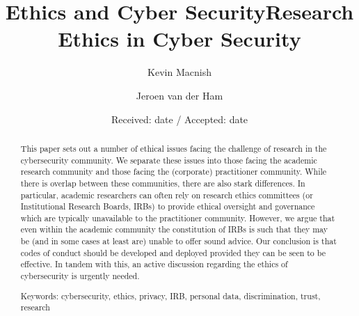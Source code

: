 \documentclass{svjour3}                     %
\begin{document}
\title{Ethics and Cyber Security}


\author{Kevin Macnish         \and
        Jeroen van der Ham}



\date{Received: date / Accepted: date}


\maketitle

\title{Research Ethics in Cyber Security}

\begin{abstract}
This paper sets out a number of ethical issues facing the challenge of research in the cybersecurity community.  We separate these issues into those facing the academic research community and those facing the (corporate) practitioner community.  While there is overlap between these communities, there are also stark differences.  In particular, academic researchers can often rely on research ethics committees (or Institutional Research Boards, IRBs) to provide ethical oversight and governance which are typically unavailable to the practitioner community.  However, we argue that even within the academic community the constitution of IRBs is such that they may be (and in some cases at least are) unable to offer sound advice. Our conclusion is that codes of conduct should be developed and deployed provided they can be seen to be effective. In tandem with this, an active discussion regarding the ethics of cybersecurity is urgently needed. 

Keywords: cybersecurity, ethics, privacy, IRB, personal data, discrimination, trust, research

\end{abstract}
\end{document}
